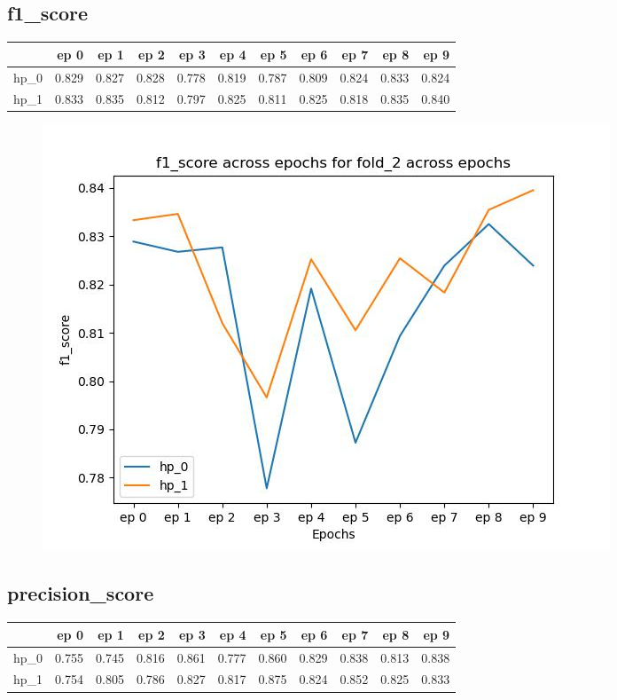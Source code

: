 \documentclass{article}
\begin{document}
\subsection{f1\_score}
\begin{tabular}{lrrrrrrrrrr}
\toprule
{} &   ep 0 &   ep 1 &   ep 2 &   ep 3 &   ep 4 &   ep 5 &   ep 6 &   ep 7 &   ep 8 &   ep 9 \\
\midrule
hp\_0 &  0.829 &  0.827 &  0.828 &  0.778 &  0.819 &  0.787 &  0.809 &  0.824 &  0.833 &  0.824 \\
hp\_1 &  0.833 &  0.835 &  0.812 &  0.797 &  0.825 &  0.811 &  0.825 &  0.818 &  0.835 &  0.840 \\
\bottomrule
\end{tabular}

\begin{figure}[H]
\includegraphics[scale = 0.75]{fold_2/f1_score}
\end{figure}
\subsection{precision\_score}
\begin{tabular}{lrrrrrrrrrr}
\toprule
{} &   ep 0 &   ep 1 &   ep 2 &   ep 3 &   ep 4 &   ep 5 &   ep 6 &   ep 7 &   ep 8 &   ep 9 \\
\midrule
hp\_0 &  0.755 &  0.745 &  0.816 &  0.861 &  0.777 &  0.860 &  0.829 &  0.838 &  0.813 &  0.838 \\
hp\_1 &  0.754 &  0.805 &  0.786 &  0.827 &  0.817 &  0.875 &  0.824 &  0.852 &  0.825 &  0.833 \\
\bottomrule
\end{tabular}
\end{document}
